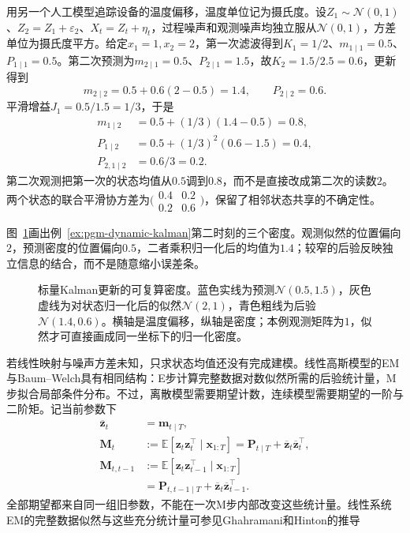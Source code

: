 \begin{example}
  \label{ex:pgm-dynamic-kalman}
  用另一个人工模型追踪设备的温度偏移，温度单位记为摄氏度。设$Z_1\sim\mathcal{N}(0,1)$、$Z_2=Z_1+\varepsilon_2$、$X_t=Z_t+\eta_t$，过程噪声和观测噪声均独立服从$\mathcal{N}(0,1)$，方差单位为摄氏度平方。给定$x_1=1,x_2=2$，第一次滤波得到$K_1=1/2$、$m_{1\mid1}=0.5$、$P_{1\mid1}=0.5$。第二次预测为$m_{2\mid1}=0.5$、$P_{2\mid1}=1.5$，故$K_2=1.5/2.5=0.6$，更新得到
  \[
    m_{2\mid2}=0.5+0.6(2-0.5)=1.4,\qquad
    P_{2\mid2}=0.6.
  \]
  平滑增益$J_1=0.5/1.5=1/3$，于是
  \[
    \begin{aligned}
      m_{1\mid2}&=0.5+(1/3)(1.4-0.5)=0.8,\\
      P_{1\mid2}&=0.5+(1/3)^2(0.6-1.5)=0.4,\\
      P_{2,1\mid2}&=0.6/3=0.2.
    \end{aligned}
  \]
  第二次观测把第一次的状态均值从$0.5$调到$0.8$，而不是直接改成第二次的读数$2$。两个状态的联合平滑协方差为$\bigl(\begin{smallmatrix}0.4&0.2\\0.2&0.6\end{smallmatrix}\bigr)$，保留了相邻状态共享的不确定性。
\end{example}

图~\ref{fig:pgm-dynamic-gaussian}画出例~\ref{ex:pgm-dynamic-kalman}第二时刻的三个密度。观测似然的位置偏向$2$，预测密度的位置偏向$0.5$，二者乘积归一化后的均值为$1.4$；较窄的后验反映独立信息的结合，而不是随意缩小误差条。

\begin{figure}[htbp]
  \centering
  
  \caption{标量Kalman更新的可复算密度。蓝色实线为预测$\mathcal{N}(0.5,1.5)$，灰色虚线为对状态归一化后的似然$\mathcal{N}(2,1)$，青色粗线为后验$\mathcal{N}(1.4,0.6)$。横轴是温度偏移，纵轴是密度；本例观测矩阵为$1$，似然才可直接画成同一坐标下的归一化密度。}
  \label{fig:pgm-dynamic-gaussian}
\end{figure}

若线性映射与噪声方差未知，只求状态均值还没有完成建模。线性高斯模型的EM与Baum--Welch具有相同结构：E步计算完整数据对数似然所需的后验统计量，M步拟合局部条件分布。不过，离散模型需要期望计数，连续模型需要期望的一阶与二阶矩。记当前参数下
\begin{equation}
  \begin{aligned}
    \overline{\bm{z}}_t&=\bm{m}_{t\mid T},\\
    \bm{M}_t
      &:=\mathbb{E}[\bm{z}_t\bm{z}_t^\top\mid\bm{x}_{1:T}]
        =\bm{P}_{t\mid T}
          +\overline{\bm{z}}_t\overline{\bm{z}}_t^\top,\\
    \bm{M}_{t,t-1}
      &:=\mathbb{E}[\bm{z}_t\bm{z}_{t-1}^\top\mid\bm{x}_{1:T}]\\
      &=\bm{P}_{t,t-1\mid T}
          +\overline{\bm{z}}_t\overline{\bm{z}}_{t-1}^\top.
  \end{aligned}
  \label{eq:pgm-dynamic-em-moments}
\end{equation}
全部期望都来自同一组旧参数，不能在一次M步内部改变这些统计量。线性系统EM的完整数据似然与这些充分统计量可参见Ghahramani和Hinton的推导

